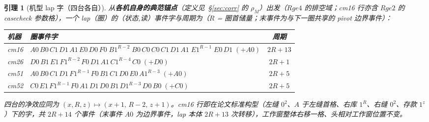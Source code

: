 \documentclass[11pt]{ctexart}
\newtheorem{lemma}[theorem]{引理}
\begin{document}
\begin{lemma}[机型 lap 字（四台各自）]\label{lem:lap}
从\textbf{各机自身的典范锚点}（定义见~\S\ref{sec:corr} 的 $\rho_M$）出发（$Rge4$ 的排空域；cm16 行亦含 $Rge2$ 的 casecheck 参数格），一个 lap（圈）的（状态,读）事件字与周期为（$R$ = 圈首储量；末事件为与下一圈共享的 pivot 边界事件）：
\begin{center}\small
\begin{tabular}{llc}
\toprule
机器 & 圈事件字 & 周期\\
\midrule
cm16 & $A0\,B0\,C1\,D1\,A1\,E0\,D0\,F0\;B1^{R-2}\;B0\,C0\,C0\,C1\,D1\,A1\;E1^{R-1}\;E0\,D1\;(+A0)$ & $2R{+}13$\\
cm26 & $D0\,B1\,E1\,F1^{R-2}\,F0\,D1\,A1\,C1^{R-4}\,C0\;(+D0)$ & $2R{+}1$\\
cm51 & $A0\,B0\,C1\,D1\,F1^{R-1}\,F0\,B1\,C1\,D0\,E0\,A1^{R-3}\;(+A0)$ & $2R{+}5$\\
cm52 & $C0\,E1\,F1^{R-1}\,F0\,A1\,D1\,D0\,B1\,D1^{R-3}\,D0\,B0\;(+C0)$ & $2R{+}5$\\
\bottomrule
\end{tabular}
\end{center}
四台的净效应同为 $(x,R,z)\mapsto(x{+}1,\,R{-}2,\,z{+}1)$。cm16 行即在论文标准构型（左缝 $0^2$、$A$ 于左缝首格、右库 $1^R$、右缝 $0^2$、存款 $1^z$）下的字，共 $2R{+}14$ 个事件（末事件 $A0$ 为边界事件，lap 本体 $2R{+}13$ 次转移），工作窗整体右移一格、头相对工作窗位置不变。
\end{lemma}
\end{document}
